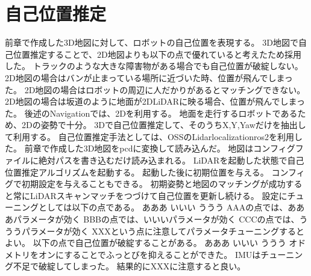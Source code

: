 \section{自己位置推定}
前章で作成した3D地図に対して、ロボットの自己位置を表現する。
3D地図で自己位置推定することで、2D地図よりも以下の点で優れていると考えたため採用した。
トラックのような大きな障害物がある場合でも自己位置が破綻しない。
2D地図の場合はバンが止まっている場所に近づいた時、位置が飛んでしまった。
2D地図の場合はロボットの周辺に人だかりがあるとマッチングできない。
2D地図の場合は坂道のように地面が2DLiDARに映る場合、位置が飛んでしまった。
後述のNavigationでは、2Dを利用する。
地面を走行するロボットであるため、2Dの姿勢で十分。
3Dで自己位置推定して、そのうちX,Y,Yawだけを抽出して利用する。
自己位置推定手法としては、OSSのLidarlocalizationros2を利用した。
前章で作成した3D地図をpcdに変換して読み込んだ。
地図はコンフィグファイルに絶対パスを書き込むだけ読み込まれる。
LiDARを起動した状態で自己位置推定アルゴリズムを起動する。
起動した後に初期位置を与える。
コンフィグで初期設定を与えることもできる。
初期姿勢と地図のマッチングが成功すると常にLiDARスキャンマッチをつづけて自己位置を更新し続ける。
設定にチューニングとしては以下の点である。
あああ
いいい
ううう
AAAの点では、あああパラメータが効く
BBBの点では、いいいパラメータが効く
CCCの点では、うううパラメータが効く
XXXという点に注意してパラメータチューニングするとよい。
以下の点で自己位置が破綻することがある。
あああ
いいい
ううう
オドメトリをオンにすることでふっとびを抑えることができた。
IMUはチューニング不足で破綻してしまった。
結果的にXXXに注意すると良い。